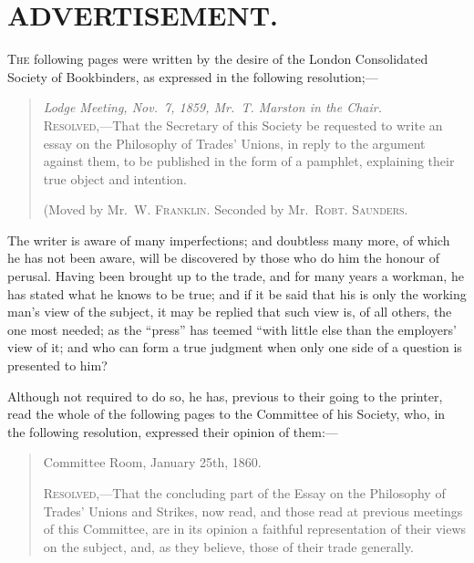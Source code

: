 \chapter*{ADVERTISEMENT.}
\thispagestyle{empty}

\textsc{The} following pages were written by the desire of the London Consolidated
Society of Bookbinders, as expressed in the following resolution;---

\begin{quote}
\textit{Lodge Meeting, Nov.\ 7, 1859, Mr.\ T. Marston in the Chair.}
\\[1em]
\textsc{Resolved,}---That the Secretary of this Society be requested to write
an essay on the Philosophy of Trades' Unions, in reply to the argument against
them, to be published in the form of a pamphlet, explaining their true object
and intention.

(Moved by Mr.\ \textsc{W. Franklin.} Seconded by Mr.\ \textsc{Robt. Saunders.}
\end{quote}

The writer is aware of many imperfections; and doubtless many more, of which
he has not been aware, will be discovered by those who do him the honour of
perusal. Having been brought up to the trade, and for many years a workman,
he has stated what he knows to be true; and if it be said that his is only the
working man's view of the subject, it may be replied that such view is, of all
others, the one most needed; as the ``press'' has teemed ``with little else
than the employers' view of it; and who can form a true judgment when only one
side of a question is presented to him?

Although not required to do so, he has, previous to their going to the printer,
read the whole of the following pages to the Committee of his Society, who, in
the following resolution, expressed their opinion of them:---

\begin{quote}
\begin{flushright}
Committee Room, January 25th, 1860.
\end{flushright}

\textsc{Resolved,}---That the concluding part of the Essay on the Philosophy of
Trades' Unions and Strikes, now read, and those read at previous meetings of
this Committee, are in its opinion a faithful representation of their views on
the subject, and, as they believe, those of their trade generally.
\end{quote}


